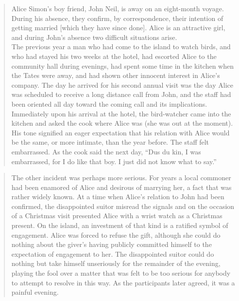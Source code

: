 \documentclass[twoside,symmetric,nobib,justified]{tufte-book}
\begin{document}
\begin{quote}
Alice Simon's boy friend, John Neil, is away on an eight-month voyage.
During his absence, they confirm, by correspondence, their intention of
getting married {[}which they have since done{]}. Alice is an attractive
girl, and during John's absence two difficult situations arise.\\
The previous year a man who had come to the island to watch birds, and
who had stayed his two weeks at the hotel, had escorted Alice to the
community hall during evenings, had spent some time in the kitchen when
the Tates were away, and had shown other innocent interest in Alice's
company. The day he arrived for his second annual visit was the day
Alice was scheduled to receive a long distance call from John, and the
staff had been oriented all day toward the coming call and its
implications. Immediately upon his arrival at the hotel, the
bird-watcher came into the kitchen and asked the cook where Alice was
(she was out at the moment). His tone signified an eager expectation
that his relation with Alice would be the same, or more intimate, than
the year before. The staff felt embarrassed. As the cook said the next
day, ``Dus du kin, I was embarrassed, for I do like that boy. I just did
not know what to say.''
\end{quote}

\begin{quote}
The other incident was perhaps more serious. For years a local commoner
had been enamored of Alice and desirous of marrying her, a fact that was
rather widely known. At a time when Alice's relation to John had been
confirmed, the disappointed suitor misread the signals and on the
occasion of a Christmas visit presented Alice with a wrist watch as a
Christmas present. On the island, an investment of that kind is a
ratified symbol of engagement. Alice was forced to refuse the gift,
although she could do nothing about the giver's having publicly
committed himself to the expectation of engagement to her. The
disappointed suitor could do nothing but take himself unseriously for
the remainder of the evening, playing the fool over a matter that was
felt to be too serious for anybody to attempt to resolve in this way. As
the participants later agreed, it was a painful evening.
\end{quote}
\end{document}
